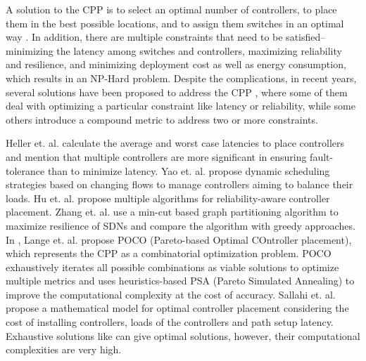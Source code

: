 \documentclass{IEEEtran}
\begin{document}
	A solution to the CPP is to select an optimal number of controllers, to place them in the best possible locations, and to assign them switches in an optimal way \cite{sdnwan2014, sdnlange2015}. In addition, there are multiple constraints that need to be satisfied-- minimizing the latency among switches and controllers, maximizing reliability and resilience, and minimizing deployment cost as well as energy consumption, which results in an NP-Hard problem. Despite the complications, in recent years, several solutions have been proposed to address the CPP \cite{cppsurvey2017, cppsurvey2018, cpp2018sudheera, sdnsurvey2017, sdniotsurvey2016}, where some of them deal with optimizing a particular constraint like latency or reliability, while some others introduce a compound metric to address two or more constraints.
	
	Heller et. al. \cite{cpp2012heller} calculate the average and worst case latencies to place controllers and mention that multiple controllers are more significant in ensuring fault-tolerance than to minimize latency. Yao et. al. \cite{yao2015controller} propose dynamic scheduling strategies based on changing flows to manage controllers aiming to balance their loads. Hu et. al. \cite{hu2013reliability} propose multiple algorithms for reliability-aware controller placement. Zhang et. al. \cite{zhang2011resilience} use a min-cut based graph partitioning algorithm to maximize resilience of SDNs and compare the algorithm with greedy approaches. In \cite{lange2015heuristic}, Lange et. al. propose POCO (Pareto-based Optimal COntroller placement), which represents the CPP as a combinatorial optimization problem. POCO exhaustively iterates all possible combinations as viable solutions to optimize multiple metrics and uses heuristics-based PSA (Pareto Simulated Annealing) to improve the computational complexity at the cost of accuracy. Sallahi et. al. \cite{sallahi2015optimal} propose a mathematical model for optimal controller placement considering the cost of installing controllers, loads of the controllers and path setup latency. Exhaustive solutions like \cite{lange2015heuristic, sallahi2015optimal} can give optimal solutions, however, their computational complexities are very high.
	
\end{document}
